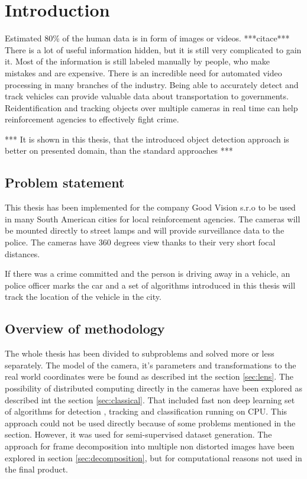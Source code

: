 \documentclass[a4paper,12pt,titlepage]{article}
\numberwithin{figure}{section}
\begin{document}

\section{Introduction}
Estimated 80\% of the human data is in form of images or videos. ***citace*** There is a lot of useful information hidden, but it is still very complicated to gain it. Most of the information is still labeled manually by people, who make mistakes and are expensive. There is an incredible need for automated video processing in many branches of the industry. Being able to accurately detect and track vehicles can provide valuable data about transportation to governments. Reidentification and tracking objects over multiple cameras in real time can help reinforcement agencies to effectively fight crime. 

*** It is shown in this thesis, that the introduced object detection approach is better on presented domain, than the standard approaches ***

\subsection{Problem statement}
This thesis has been implemented for the company Good Vision s.r.o to be used in many South American cities for local reinforcement agencies. The cameras will be mounted directly to street lamps and will provide surveillance data to the police. The cameras have 360 degrees view thanks to their very short focal distances. 

If there was a crime committed and the person is driving away in a vehicle, an police officer marks the car and a set of algorithms introduced in this thesis will track the location of the vehicle in the city.

\subsection{Overview of methodology}

The whole thesis has been divided to subproblems and solved more or less separately. The model of the camera, it's parameters and transformations to the real world coordinates were be found as described int the section \ref{sec:lens}. The possibility of distributed computing directly in the cameras have been explored as described int the section \ref{sec:classical}. That included fast non deep learning set of algorithms for detection \cite{piccardi2004background}, tracking \cite{optical-flow} and classification \cite{haar} running on CPU. This approach could not be used directly because of some problems mentioned in the section. However, it was used for semi-supervised dataset generation. The approach for frame decomposition into multiple non distorted images have been explored in section \ref{sec:decomposition}, but for computational reasons not used in the final product. 
\end{document}
